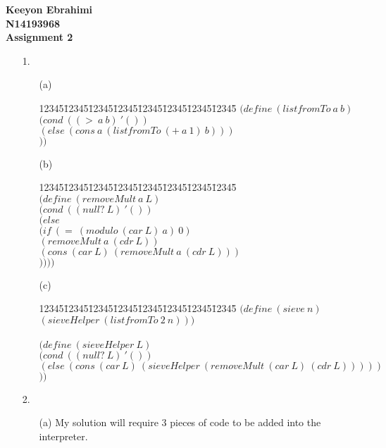 \documentclass[11pt]{article}
\newenvironment{code}{\begin{tabbing}
12345\=12345\=12345\=12345\=12345\=12345\=12345\=12345\= \kill }
{\end{tabbing}}
\begin{document}
\textbf{Keeyon Ebrahimi}\\
\textbf{N14193968}\\
\textbf{Assignment 2}\\

\begin{enumerate}
\item[1. ]

\begin{enumerate}
\item[(a)] 
\begin{code}
$(define\ (listfromTo\ a\ b)$\\
\> $(cond\ ((>\ a\ b)\ '())$\\
\> \> $(else\ (cons\ a\ (listfromTo\ (+\ a\ 1)\ b)))$\\
\> \> $))$ \\
\end{code}

\item[(b)]

\begin{code}
$(define\ (removeMult\ a\ L)$\\
\> $(cond\ ((null?\ L)\ '())$\\
\> \> $(else\ $\\
\> \> \> $(if\ (=\ (modulo\ (car\ L)\ a)\ 0)$\\
\> \> \> \> $(removeMult\ a\ (cdr\ L))$\\
\> \> \> \> $(cons\ (car\ L)\ (removeMult\ a\ (cdr\ L)))$\\
\> \> \> \> $))))$\\
\end{code}

\item[(c)]

\begin{code}
$(define\ (sieve\ n)$ \\
\> $(sieveHelper\ (listfromTo\ 2\ n)))$ \\ \\
$(define\ (sieveHelper\ L)$\\
\> $(cond\ ((null?\ L)\ '())$ \\
\> \> $(else\ (cons\ (car\ L)\ (sieveHelper\ (removeMult\ (car\ L)\ (cdr\ L)))))$\\
\> \> $))$\\
\end{code}
\end{enumerate}

\item[2. ] 
\begin{enumerate}
\item[(a)] My solution will require 3 pieces of code to be added into the interpreter.  


\end{enumerate}
\end{enumerate}
\end{document}
